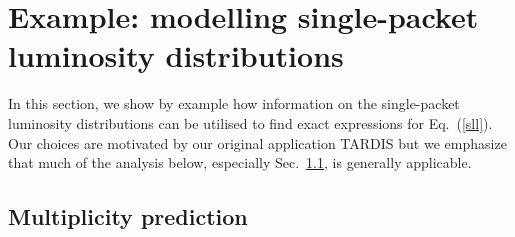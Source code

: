 \documentclass[11pt]{article}
\newcommand{\refsec}[1]{Sec.~\ref{sec:#1}}
\newcommand{\tardis}{TARDIS}
\begin{document}
\section{Example: modelling single-packet luminosity distributions}
\label{sec:example}

In this section, we show by example how information on the
single-packet luminosity distributions can be utilised to find exact
expressions for Eq.~(\ref{sll}). Our choices are motivated by our
original application \tardis{} but we emphasize that much of the
analysis below, especially \refsec{multiplicity}, is generally
applicable.

\subsection{Multiplicity prediction} \label{sec:multiplicity}
\end{document}
